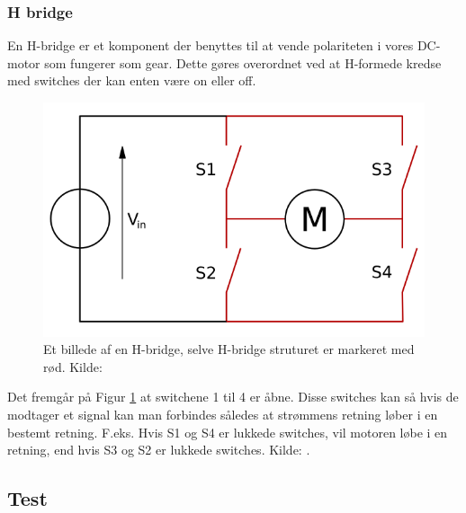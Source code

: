 \subsubsection{H bridge}
En H-bridge er et komponent der benyttes til at vende polariteten i vores DC-motor som fungerer som gear. Dette gøres overordnet ved at H-formede kredse med switches der kan enten være on eller off. 
\begin{figure}[H]
	\centering
    \includegraphics[width=13cm]{figures/2_4_3hastighed/hbridge.png}
	\caption{Et billede af en H-bridge, selve H-bridge struturet er markeret med rød. Kilde: \cite{teorihbridge}}
	\label{fig:hbridge}
\end{figure}
Det fremgår på Figur \ref{fig:hbridge} at switchene 1 til 4 er åbne. Disse switches kan så hvis de modtager et signal kan man forbindes således at strømmens retning løber i en bestemt retning. F.eks. Hvis S1 og S4 er lukkede switches, vil motoren løbe i en retning, end hvis S3 og S2 er lukkede switches. Kilde: \cite{teorihbridge}. 


\subsection{Test}
